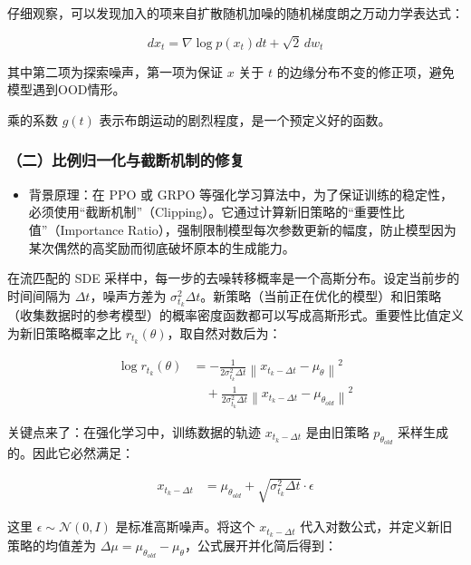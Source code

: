 仔细观察，可以发现加入的项来自扩散随机加噪的随机梯度朗之万动力学表达式：

\[
dx_t=\nabla\log p(x_t)dt+\sqrt{2}\,dw_t
\]

其中第二项为探索噪声，第一项为保证 \(x\) 关于 \(t\) 的边缘分布不变的修正项，避免模型遇到OOD情形。

乘的系数 \(g(t)\) 表示布朗运动的剧烈程度，是一个预定义好的函数。

\hypertarget{ux4e8cux6bd4ux4f8bux5f52ux4e00ux5316ux4e0eux622aux65adux673aux5236ux7684ux4feeux590d}{%
\subsubsection{（二）比例归一化与截断机制的修复}\label{ux4e8cux6bd4ux4f8bux5f52ux4e00ux5316ux4e0eux622aux65adux673aux5236ux7684ux4feeux590d}}

\begin{itemize}
\tightlist
\item
  背景原理：在 PPO 或 GRPO 等强化学习算法中，为了保证训练的稳定性，必须使用``截断机制''（Clipping）。它通过计算新旧策略的``重要性比值''（Importance Ratio），强制限制模型每次参数更新的幅度，防止模型因为某次偶然的高奖励而彻底破坏原本的生成能力。
\end{itemize}

在流匹配的 SDE 采样中，每一步的去噪转移概率是一个高斯分布。设定当前步的时间间隔为 \(\Delta t\)，噪声方差为 \(\sigma_{t_k}^2\Delta t\)。新策略（当前正在优化的模型）和旧策略（收集数据时的参考模型）的概率密度函数都可以写成高斯形式。重要性比值定义为新旧策略概率之比 \(r_{t_k}(\theta)\)，取自然对数后为：

\[
\begin{aligned}
\log r_{t_k}(\theta)
&=
-\frac{1}{2\sigma_{t_k}^2\Delta t}
\left\|x_{t_k-\Delta t}-\mu_\theta\right\|^2
\\
&\quad+
\frac{1}{2\sigma_{t_k}^2\Delta t}
\left\|x_{t_k-\Delta t}-\mu_{\theta_{old}}\right\|^2
\end{aligned}
\]

关键点来了：在强化学习中，训练数据的轨迹 \(x_{t_k-\Delta t}\) 是由旧策略 \(p_{\theta_{old}}\) 采样生成的。因此它必然满足：

\[
\begin{aligned}
x_{t_k-\Delta t}
&=
\mu_{\theta_{old}}+\sqrt{\sigma_{t_k}^2\Delta t}\cdot\epsilon
\end{aligned}
\]

这里 \(\epsilon\sim\mathcal{N}(0,I)\) 是标准高斯噪声。将这个 \(x_{t_k-\Delta t}\) 代入对数公式，并定义新旧策略的均值差为 \(\Delta\mu=\mu_{\theta_{old}}-\mu_\theta\)，公式展开并化简后得到：

